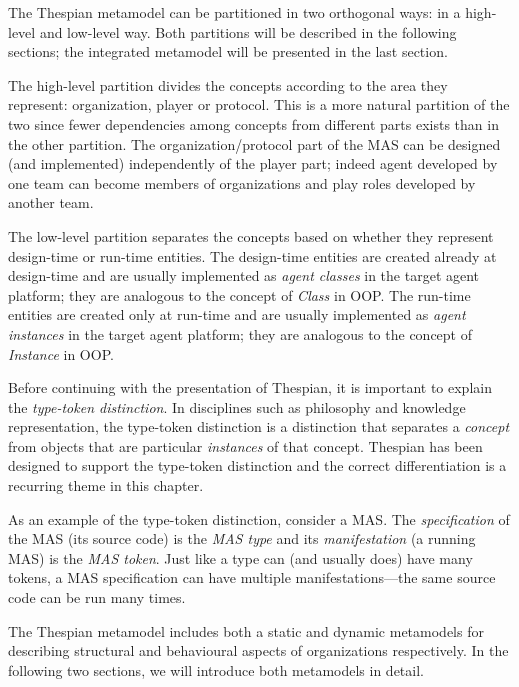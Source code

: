 The Thespian metamodel can be partitioned in two orthogonal ways: in a high-level and low-level way.
Both partitions will be described in the following sections; the integrated metamodel will be presented in the last section.

The high-level partition divides the concepts according to the area they represent: organization, player or protocol.
This is a more natural partition of the two since fewer dependencies among concepts from different parts exists than in the other partition.
The organization/protocol part of the MAS can be designed (and implemented) independently of the player part; indeed agent developed by one team can become members of organizations and play roles developed by another team. 

The low-level partition separates the concepts based on whether they represent design-time or run-time entities.
The design-time entities are created already at design-time and are usually implemented as \textit{agent classes} in the target agent platform; they are analogous to the concept of \textit{Class} in OOP.
The run-time entities are created only at run-time and are usually implemented as \textit{agent instances} in the target agent platform; they are analogous to the concept of \textit{Instance} in OOP.

Before continuing with the presentation of Thespian, it is important to explain the \textit{type-token distinction}.
In disciplines such as philosophy and knowledge representation, the type-token distinction is a distinction that separates a \textit{concept} from objects that are particular \textit{instances} of that concept.
Thespian has been designed to support the type-token distinction and the correct differentiation is a recurring theme in this chapter.

As an example of the type-token distinction, consider a MAS.
The \textit{specification} of the MAS (its source code) is the \textit{MAS type} and its \textit{manifestation} (a running MAS) is the \textit{MAS token}.
Just like a type can (and usually does) have many tokens, a MAS specification can have multiple manifestations---the same source code can be run many times.

The Thespian metamodel includes both a static and dynamic metamodels for describing structural and behavioural aspects of organizations respectively.
In the following two sections, we will introduce both metamodels in detail.



